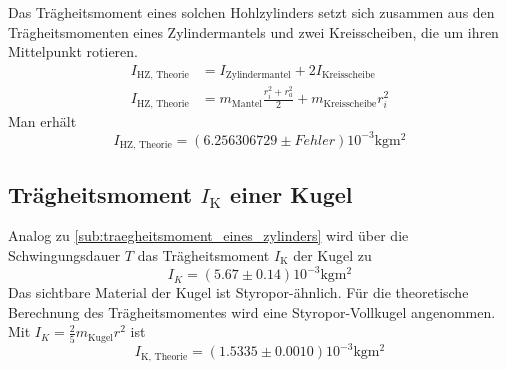 Das Trägheitsmoment eines solchen Hohlzylinders setzt sich zusammen aus den Trägheitsmomenten eines Zylindermantels und zwei Kreisscheiben, die um ihren Mittelpunkt rotieren.
\begin{align*}
	I_{\text{HZ, Theorie}}&=I_{\text{Zylindermantel}}+2I_{\text{Kreisscheibe}}\\
	I_{\text{HZ, Theorie}}&=m_\text{Mantel} \frac{r_i^2+r_a^2}{2}+m_\text{Kreisscheibe} r_i^2
\end{align*}
Man erhält
\begin{equation}
	I_{\text{HZ, Theorie}}= (6.256306729\pm Fehler)10^{-3} \si{\kilo\gram\meter\squared}
\end{equation}

\subsection{Trägheitsmoment $I_\text{K}$ einer Kugel}

Analog zu \ref{sub:traegheitsmoment_eines_zylinders} wird über die Schwingungsdauer $T$ das Trägheitsmoment $I_\text{K}$ der Kugel zu
\begin{equation}
	\label{wert:Kugel}
	I_K=(5.67\pm0.14)10^{-3} \si{\kilo\gram\meter\squared}
\end{equation}
Das sichtbare Material der Kugel ist Styropor-ähnlich. 
Für die theoretische Berechnung des Trägheitsmomentes wird eine Styropor-Vollkugel angenommen. 
Mit $I_K = \frac{2}{5} m_{\text{Kugel}} r^2$ ist 
\begin{equation}
	\label{wert:Kugel}
	I_\text{K, Theorie}= (1.5335\pm0.0010)10^{-3} \si{\kilo\gram\meter\squared}
\end{equation}



